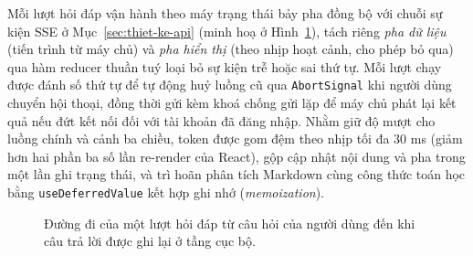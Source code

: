 Mỗi lượt hỏi đáp vận hành theo máy trạng thái bảy pha đồng bộ với chuỗi sự kiện SSE ở Mục~\ref{sec:thiet-ke-api} (minh hoạ ở Hình~\ref{fig:luong-hoi-dap-fe}), tách riêng \textit{pha dữ liệu} (tiến trình từ máy chủ) và \textit{pha hiển thị} (theo nhịp hoạt cảnh, cho phép bỏ qua) qua hàm reducer thuần tuý loại bỏ sự kiện trễ hoặc sai thứ tự. Mỗi lượt chạy được đánh số thứ tự để tự động huỷ luồng cũ qua \texttt{AbortSignal} khi người dùng chuyển hội thoại, đồng thời gửi kèm khoá chống gửi lặp để máy chủ phát lại kết quả nếu đứt kết nối đối với tài khoản đã đăng nhập. Nhằm giữ độ mượt cho luồng chính và cảnh ba chiều, token được gom đệm theo nhịp tối đa 30 ms (giảm hơn hai phần ba số lần re-render của React), gộp cập nhật nội dung và pha trong một lần ghi trạng thái, và trì hoãn phân tích Markdown cùng công thức toán học bằng \texttt{useDeferredValue} kết hợp ghi nhớ (\textit{memoization}).

\begin{figure}[htbp]
    \centering
    \caption{Đường đi của một lượt hỏi đáp từ câu hỏi của người dùng đến khi câu trả lời được ghi lại ở tầng cục bộ.}
    \label{fig:luong-hoi-dap-fe}
\end{figure}

